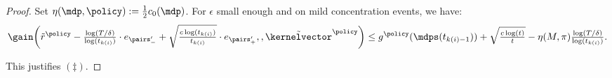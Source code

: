 \documentclass[preprint,cleveref,12pt]{colt2025}
\DeclarePairedDelimiter{\parens}{(}{)}	%
\def\model{\mdp}
\def\models{\mdps}
\def\kernel{\kernelvector}
\begin{document}
\begin{proof}
        Set $\eta(\model, \policy) := \tfrac 12 c_0(\model)$. 
        For $\epsilon$ small enough and on mild concentration events, we have:
        {
            \small
            \begin{equation*}
                \gain\parens*{
                    \tilde{r}^\policy - \tfrac{\log(T/\delta)}{\log(t_{k(i)})} \cdot e_{\pairs'_-} + \sqrt{\tfrac{c\log(t_{k(i)})}{t_{k(i)}}} \cdot e_{\pairs'_+},
                    ,
                    \tilde{\kernel}^\policy
                }
                \le
                g^\policy(\models(t_{k(i)-1})) 
                + \sqrt{\tfrac {c \log(t)}t}
                - \eta(M, \pi) \tfrac{\log(T/\delta)}{\log (t_{k(i)})}
                .
            \end{equation*}
        }

        This justifies $(\ddagger)$.


\end{proof}
\end{document}

